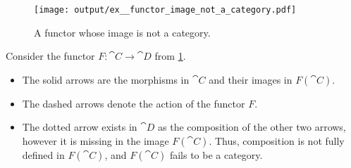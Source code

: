 \begin{example}\label{ex:functor_image_not_a_category}
  \begin{figure}
    \hfill
    \texttt{[image: output/ex\_\_functor\_image\_not\_a\_category.pdf]}
    \hfill
    \hfill
    \caption{A functor whose image is not a category.}\label{fig:ex:functor_image_not_a_category}
  \end{figure}

  Consider the functor \( F: \cat{C} \to \cat{D} \) from \cref{fig:ex:functor_image_not_a_category}.

  \begin{itemize}
    \item The solid arrows are the morphisms in \( \cat{C} \) and their images in \( F(\cat{C}) \).
    \item The dashed arrows denote the action of the functor \( F \).
    \item The dotted arrow exists in \( \cat{D} \) as the composition of the other two arrows, however it is missing in the image \( F(\cat{C}) \). Thus, composition is not fully defined in \( F(\cat{C}) \), and \( F(\cat{C}) \) fails to be a category.
  \end{itemize}
\end{example}

